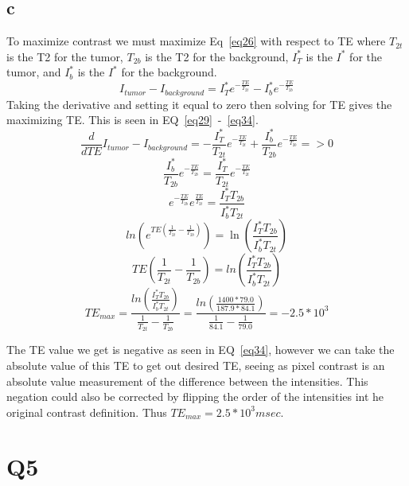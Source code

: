 \documentclass[12pt]{article}
\begin{document}
\subsection{c}
To maximize contrast we must maximize Eq~\ref{eq26} with respect to TE where $T_{2t}$ is the T2 for the tumor, $T_{2b}$ is the T2 for the background, $I^*_T$ is the $I^*$ for the tumor, and $I^*_b$ is the $I^*$ for the background.
\begin{equation}
I_{tumor}-I_{background} = I^*_Te^{-\frac{TE}{T_{2t}}}-I^*_be^{-\frac{TE}{T_{2b}}} 
\label{eq26}
\end{equation}
Taking the derivative and setting it equal to zero then solving for TE gives the maximizing TE. This is seen in EQ~\ref{eq29}~-~\ref{eq34}.
\begin{equation}
\frac{d}{dTE}I_{tumor}-I_{background} = -\frac{I^*_T}{T_{2t}}e^{-\frac{TE}{T_{2t}}}+\frac{I^*_b}{T_{2b}}e^{-\frac{TE}{T_{2b}}} => 0
\label{eq29}
\end{equation}
\begin{equation}
\frac{I^*_b}{T_{2b}}e^{-\frac{TE}{T_{2b}}}=\frac{I^*_T}{T_{2t}}e^{-\frac{TE}{T_{2t}}}
\label{eq30}
\end{equation}
\begin{equation}
e^{-\frac{TE}{T_{2b}}}e^{\frac{TE}{T_{2t}}}=\frac{I^*_TT_{2b}}{I^*_bT_{2t}}
\label{eq31}
\end{equation}
\begin{equation}
ln(e^{TE(\frac{1}{T_{2t}}-\frac{1}{T_{2b}})})=\ln(\frac{I^*_TT_{2b}}{I^*_bT_{2t}})
\label{eq32}
\end{equation}
\begin{equation}
TE(\frac{1}{T_{2t}}-\frac{1}{T_{2b}})=ln(\frac{I^*_TT_{2b}}{I^*_bT_{2t}})
\label{eq33}
\end{equation}
\begin{equation}
TE_{max}=\frac{ln(\frac{I^*_TT_{2b}}{I^*_bT_{2t}})}{\frac{1}{T_{2t}}-\frac{1}{T_{2b}}} = \frac{ln(\frac{1400*79.0}{187.9*84.1})}{\frac{1}{84.1}-\frac{1}{79.0}} = -2.5*10^3
\label{eq34}
\end{equation}

The TE value we get is negative as seen in EQ~\ref{eq34}, however we can take the absolute value of this TE to get out desired TE, seeing as pixel contrast is an absolute value measurement of the difference between the intensities. This negation could also be corrected by flipping the order of the intensities int he original contrast definition. Thus $TE_{max} = 2.5*10^3 msec$.

\section{Q5}
\end{document}
